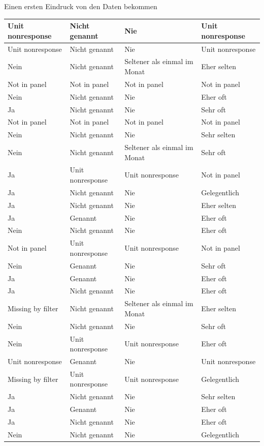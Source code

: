 \documentclass[ignorenonframetext,]{beamer}
\begin{document}
\begin{frame}{Einen ersten Eindruck von den Daten bekommen}
\begin{tabular}{l|l|l|l}
\hline
Unit nonresponse & Nicht genannt & Nie & Unit nonresponse\\
\hline
Unit nonresponse & Nicht genannt & Nie & Unit nonresponse\\
\hline
Nein & Nicht genannt & Seltener als einmal im Monat & Eher selten\\
\hline
Not in panel & Not in panel & Not in panel & Not in panel\\
\hline
Nein & Nicht genannt & Nie & Eher oft\\
\hline
Ja & Nicht genannt & Nie & Sehr oft\\
\hline
Not in panel & Not in panel & Not in panel & Not in panel\\
\hline
Nein & Nicht genannt & Nie & Sehr selten\\
\hline
Nein & Nicht genannt & Seltener als einmal im Monat & Sehr oft\\
\hline
Ja & Unit nonresponse & Unit nonresponse & Not in panel\\
\hline
Ja & Nicht genannt & Nie & Gelegentlich\\
\hline
Ja & Nicht genannt & Nie & Eher selten\\
\hline
Ja & Genannt & Nie & Eher oft\\
\hline
Nein & Nicht genannt & Nie & Eher oft\\
\hline
Not in panel & Unit nonresponse & Unit nonresponse & Not in panel\\
\hline
Nein & Genannt & Nie & Sehr oft\\
\hline
Ja & Genannt & Nie & Eher oft\\
\hline
Ja & Nicht genannt & Nie & Eher oft\\
\hline
Missing by filter & Nicht genannt & Seltener als einmal im Monat & Eher selten\\
\hline
Nein & Nicht genannt & Nie & Sehr oft\\
\hline
Nein & Unit nonresponse & Unit nonresponse & Eher oft\\
\hline
Unit nonresponse & Genannt & Nie & Unit nonresponse\\
\hline
Missing by filter & Unit nonresponse & Unit nonresponse & Gelegentlich\\
\hline
Ja & Nicht genannt & Nie & Sehr selten\\
\hline
Ja & Genannt & Nie & Eher oft\\
\hline
Ja & Nicht genannt & Nie & Eher oft\\
\hline
Nein & Nicht genannt & Nie & Gelegentlich\\

\end{tabular}
\end{frame}
\end{document}
